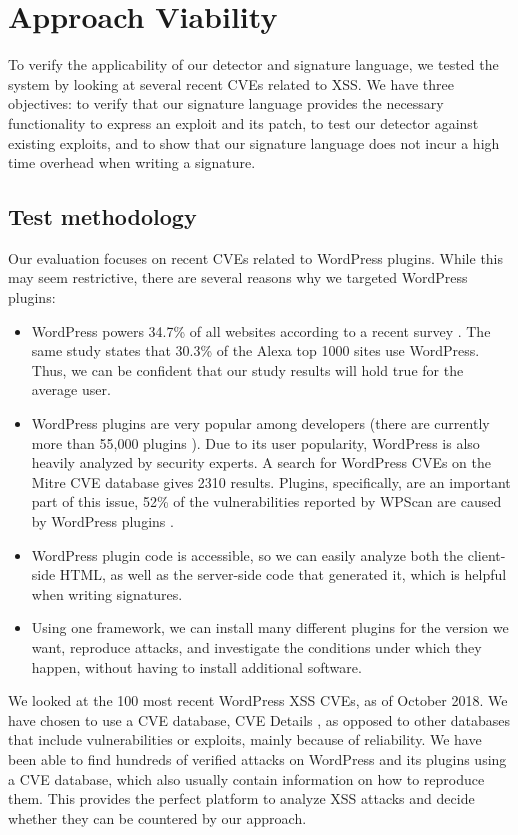 \section{Approach Viability} \label{viability}

To verify the applicability of our detector and signature language, we tested the system by looking at several recent CVEs related to \ac{XSS}. We have three objectives: to verify that our signature language provides the necessary functionality to express an exploit and its patch, to test our detector against existing exploits, and to show that our signature language does not incur a high time overhead when writing a signature.

\subsection{Test methodology} \label{methodology}

Our evaluation focuses on recent CVEs related to WordPress
plugins. While this may seem restrictive, there are several reasons
why we targeted WordPress plugins:
\begin{itemize}
	\item WordPress powers 34.7\% of all websites according to a recent survey  \cite{w3stats} \cite{DBLP:journals/corr/abs-1801-01203}. The same study states that 30.3\% of the Alexa top 1000 sites use WordPress. Thus, we can be confident that our study results will hold true for the average user.
	\item WordPress plugins are very popular among developers (there are currently more than 55,000 plugins \cite{wpplugins}). Due to its user popularity, WordPress is also heavily analyzed by security experts. A search for WordPress CVEs on the Mitre CVE database \cite{cvemitre} gives 2310 results. Plugins, specifically, are an important part of this issue, 52\% of the vulnerabilities reported by WPScan are caused by WordPress plugins \cite{wpscan}.
	\item WordPress plugin code is accessible, so we can easily analyze both the client-side HTML, as well as the server-side code that generated it, which is helpful when writing signatures.
	\item Using one framework, we can install many different plugins for the version we want, reproduce attacks, and investigate the conditions under which they happen, without having to install additional software.
\end{itemize}

We looked at the 100 most recent WordPress \ac{XSS} CVEs, as of October 2018. We have chosen to use a CVE database, CVE Details \cite{cvedetails}, as opposed to other databases that include vulnerabilities or exploits, mainly because of reliability. We have been able to find hundreds of verified attacks on WordPress and its plugins using a CVE database, which also usually contain information on how to reproduce them. This provides the perfect platform to analyze \ac{XSS} attacks and decide whether they can be countered by our approach. 

